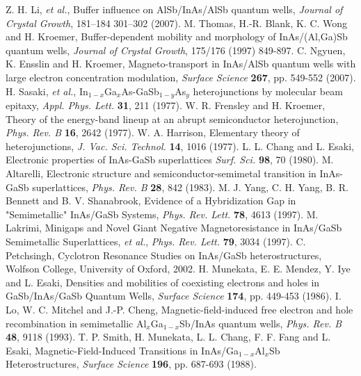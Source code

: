 \documentclass[titlepage,a4paper]{book}
\begin{document}
\begin{thebibliography}{99}
Z. H. Li, \textit{et al.}, Buffer influence on AlSb/InAs/AlSb quantum wells, \textit{Journal of Crystal Growth}, 181–184 301–302 (2007).
M. Thomas, H.-R. Blank, K. C. Wong and H. Kroemer, Buffer-dependent mobility and morphology of InAs/(Al,Ga)Sb quantum wells, \textit{Journal of Crystal Growth}, 175/176 (1997) 849-897.
C. Ngyuen, K. Ensslin and H. Kroemer, Magneto-transport in InAs/AlSb quantum wells with large electron concentration modulation, \textit{Surface Science} \textbf{267}, pp. 549-552 (2007).
H. Sasaki, \textit{et al.}, In$_{1-x}$Ga$_x$As-GaSb$_{1-y}$As$_y$ heterojunctions by molecular beam epitaxy, \textit{Appl. Phys. Lett.} \textbf{31}, 211 (1977).
W. R. Frensley and H. Kroemer, Theory of the energy-band lineup at an abrupt semiconductor heterojunction, \textit{Phys. Rev. B} \textbf{16}, 2642 (1977).
W. A. Harrison, Elementary theory of heterojunctions, \textit{J. Vac. Sci. Technol.} \textbf{14}, 1016 (1977).
L. L. Chang and L. Esaki, Electronic properties of InAs-GaSb superlattices \textit{Surf. Sci.} \textbf{98}, 70 (1980).
M. Altarelli, Electronic structure and semiconductor-semimetal transition in InAs-GaSb superlattices, \textit{Phys. Rev. B} \textbf{28}, 842 (1983).
M. J. Yang, C. H. Yang, B. R. Bennett and B. V. Shanabrook, Evidence of a Hybridization Gap in "Semimetallic" InAs/GaSb Systems, \textit{Phys. Rev. Lett.} \textbf{78}, 4613 (1997).
M. Lakrimi, Minigaps and Novel Giant Negative Magnetoresistance in InAs/GaSb Semimetallic Superlattices, \textit{et al.}, \textit{Phys. Rev. Lett.} \textbf{79}, 3034 (1997).
C. Petchsingh, Cyclotron Resonance Studies on InAs/GaSb heterostructures, Wolfson College, University of Oxford, 2002.
H. Munekata, E. E. Mendez, Y. Iye and L. Esaki, Densities and mobilities of coexisting electrons and holes in GaSb/InAs/GaSb Quantum Wells, \textit{Surface Science} \textbf{174}, pp. 449-453 (1986).
I. Lo, W. C. Mitchel and J.-P. Cheng, Magnetic-field-induced free electron and hole recombination in semimetallic Al$_x$Ga$_{1-x}$Sb/InAs quantum wells, \textit{Phys. Rev. B} \textbf{48}, 9118 (1993).
T. P. Smith, H. Munekata, L. L. Chang, F. F. Fang and L. Esaki, Magnetic-Field-Induced Transitions in InAs/Ga$_{1-x}$Al$_x$Sb Heterostructures, \textit{Surface Science} \textbf{196}, pp. 687-693 (1988).

\end{thebibliography}
\end{document}
